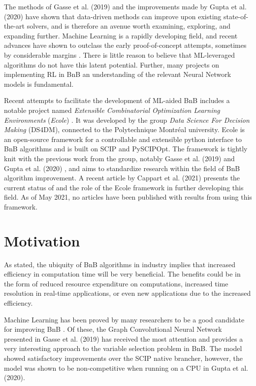 The methods of Gasse et al. (2019) \cite{gasse2019exact} and the improvements made by Gupta et al. (2020) \cite{gupta2020hybrid} have shown that data-driven methods can improve upon existing state-of-the-art solvers, and is therefore an avenue worth examining, exploring, and expanding further. Machine Learning is a rapidly developing field, and recent advances have shown to outclass the early proof-of-concept attempts, sometimes by considerable margins \cite{holzinger2018current}. There is little reason to believe that \gls{ML}-leveraged algorithms do not have this latent potential. Further, many projects on implementing \gls{RL} in \gls{BnB} \cite{tang2020reinforcement,etheve2020reinforcement} an understanding of the relevant Neural Network models is fundamental. 

Recent attempts to facilitate the development of \gls{ML}-aided \gls{BnB} includes a notable project named \textit{Extensible Combinatorial Optimization Learning Environments} (\emph{Ecole}) \cite{prouvost2020ecole, prouvost2021ecole}. It was developed by the group \textit{Data Science For Decision Making} (\gls{DS4DM}), connected to the Polytechnique Montr\'{e}al university. \gls{Ecole} is an open-source framework for a controllable and extensible python interface to \gls{BnB} algorithms and is built on \gls{SCIP} and PySCIPOpt. The framework is tightly knit with the previous work from the group, notably Gasse et al. (2019) \cite{gasse2019exact} and Gupta et al. (2020) \cite{gupta2020hybrid}, and aims to standardize research within the field of \gls{BnB} algorithm improvement.  
 A recent article by
Cappart et al. (2021) \cite{cappart2021combinatorial} presents the current status of and the role of the \gls{Ecole} framework in further developing this field. 
As of May 2021, no articles have been published with results from using this framework.



\section{Motivation}\label{sec:motivation}

As stated, the ubiquity of \gls{BnB} algorithms in industry implies that increased efficiency in computation time will be very beneficial. The benefits could be in the form of reduced resource expenditure on computations, increased time resolution in real-time applications, or even new applications due to the increased efficiency.  

Machine Learning has been proved by many researchers to be a good candidate for improving \gls{BnB} \cite{khalil2016learning,gasse2019exact,gupta2020hybrid,khalil2020towards,etheve2020reinforcement}. Of these, the Graph Convolutional Neural Network presented in Gasse et al. (2019) \cite{gasse2019exact} has received the most attention and provides a very interesting approach to the variable selection problem in \gls{BnB}. The model showed satisfactory improvements over the \gls{SCIP} native brancher, however, the model was shown to be non-competitive when running on a \gls{CPU} in Gupta et al. (2020). 

